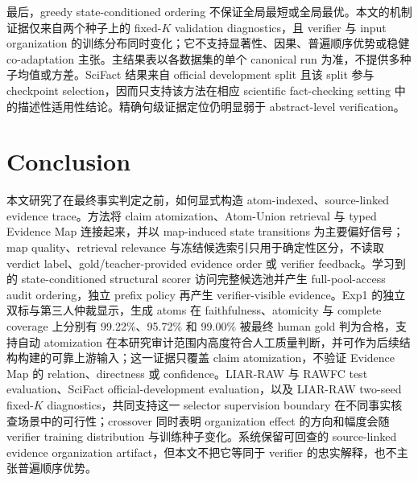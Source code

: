 \documentclass[letterpaper]{article}
\begin{document}
最后，greedy state-conditioned ordering 不保证全局最短或全局最优。本文的机制证据仅来自两个种子上的 fixed-$K$ validation diagnostics，且 verifier 与 input organization 的训练分布同时变化；它不支持显著性、因果、普遍顺序优势或稳健 co-adaptation 主张。主结果表以各数据集的单个 canonical run 为准，不提供多种子均值或方差。SciFact 结果来自 official development split 且该 split 参与 checkpoint selection，因而只支持该方法在相应 scientific fact-checking setting 中的描述性适用性结论。精确句级证据定位仍明显弱于 abstract-level verification。

\section{Conclusion}

本文研究了在最终事实判定之前，如何显式构造 atom-indexed、source-linked evidence trace。方法将 claim atomization、Atom-Union retrieval 与 typed Evidence Map 连接起来，并以 map-induced state transitions 为主要偏好信号；map quality、retrieval relevance 与冻结候选索引只用于确定性区分，不读取 verdict label、gold/teacher-provided evidence order 或 verifier feedback。学习到的 state-conditioned structural scorer 访问完整候选池并产生 full-pool-access audit ordering，独立 prefix policy 再产生 verifier-visible evidence。Exp1 的独立双标与第三人仲裁显示，生成 atoms 在 faithfulness、atomicity 与 complete coverage 上分别有 99.22\%、95.72\% 和 99.00\% 被最终 human gold 判为合格，支持自动 atomization 在本研究审计范围内高度符合人工质量判断，并可作为后续结构构建的可靠上游输入；这一证据只覆盖 claim atomization，不验证 Evidence Map 的 relation、directness 或 confidence。LIAR-RAW 与 RAWFC test evaluation、SciFact official-development evaluation，以及 LIAR-RAW two-seed fixed-$K$ diagnostics，共同支持这一 selector supervision boundary 在不同事实核查场景中的可行性；crossover 同时表明 organization effect 的方向和幅度会随 verifier training distribution 与训练种子变化。系统保留可回查的 source-linked evidence organization artifact，但本文不把它等同于 verifier 的忠实解释，也不主张普遍顺序优势。


\end{document}

